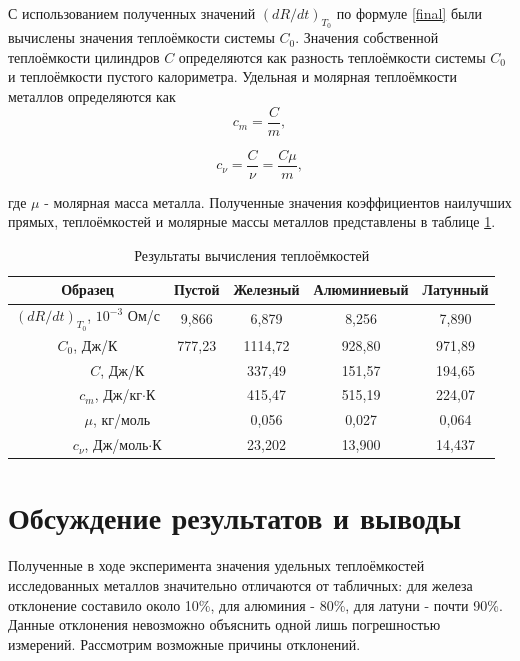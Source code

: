 \documentclass[a4paper,12pt]{article} %
\begin{document}
С использованием полученных значений $(dR/dt)_{T_0}$ по формуле \eqref{final} были вычислены значения теплоёмкости системы $C_0$. Значения собственной теплоёмкости цилиндров $C$ определяются как разность теплоёмкости системы $C_0$ и теплоёмкости пустого калориметра. Удельная и молярная теплоёмкости металлов определяются как
\begin{equation}
    c_m = \frac{C}{m},
\end{equation}

\begin{equation}
    c_\nu = \frac{C}{\nu} = \frac{C\mu}{m},
\end{equation}

где $\mu$ - молярная масса металла. Полученные значения коэффициентов наилучших прямых, теплоёмкостей и молярные массы металлов представлены в таблице \ref{tab:results}.

\begin{table}[h]
    \centering
    \begin{tabular}{|c|c|c|c|c|} \hline
    Образец & Пустой & Железный & Алюминиевый & Латунный \\ \hline
    $(dR/dt)_{T_0}$, $10^{-3}$ Ом/с & 9,866 & 6,879 & 8,256 & 7,890 \\ \hline
    $C_0$, Дж/К & 777,23 & 1114,72 & 928,80 & 971,89 \\ \hline
    \multicolumn{2}{|c|}{$C$, Дж/К} & 337,49 & 151,57 & 194,65 \\ \hline
    \multicolumn{2}{|c|}{$c_m$, Дж/кг$\cdot$К} & 415,47 & 515,19 & 224,07 \\ \hline
    \multicolumn{2}{|c|}{$\mu$, кг/моль} & 0,056 & 0,027 & 0,064 \\ \hline
    \multicolumn{2}{|c|}{$c_\nu$, Дж/моль$\cdot$К} & 23,202 & 13,900 & 14,437 \\ \hline
    \end{tabular}
    \caption{Результаты вычисления теплоёмкостей}
    \label{tab:results}
\end{table}

\section{Обсуждение результатов и выводы}

Полученные в ходе эксперимента значения удельных теплоёмкостей исследованных металлов значительно отличаются от табличных: для железа отклонение составило около 10\%, для алюминия - 80\%, для латуни - почти 90\%. Данные отклонения невозможно объяснить одной лишь погрешностью измерений. Рассмотрим возможные причины отклонений.
\end{document}
